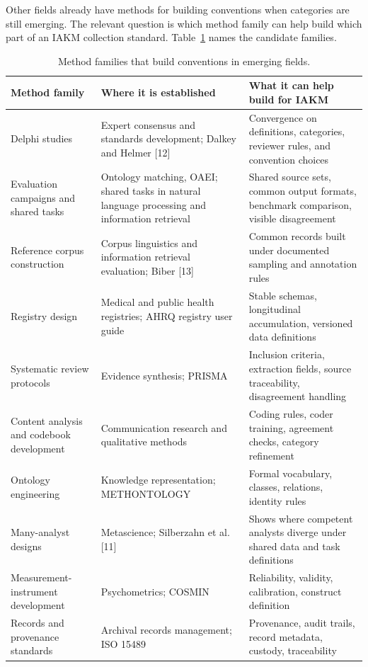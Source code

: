 \documentclass[preprints,article,submit,moreauthors]{Definitions/mdpi}
\begin{document}
Other fields already have methods for building conventions when categories are still emerging. The relevant question is which method family can help build which part of an IAKM collection standard. Table~\ref{tab:families} names the candidate families.

\begin{table}[H]
\caption{Method families that build conventions in emerging fields.}
\label{tab:families}
\centering
\scriptsize
\begin{tabularx}{\textwidth}{XXX}
\hline
\textbf{Method family} & \textbf{Where it is established} & \textbf{What it can help build for IAKM} \\
\hline
Delphi studies & Expert consensus and standards development; Dalkey and Helmer [12] & Convergence on definitions, categories, reviewer rules, and convention choices \\
Evaluation campaigns and shared tasks & Ontology matching, OAEI; shared tasks in natural language processing and information retrieval & Shared source sets, common output formats, benchmark comparison, visible disagreement \\
Reference corpus construction & Corpus linguistics and information retrieval evaluation; Biber [13] & Common records built under documented sampling and annotation rules \\
Registry design & Medical and public health registries; AHRQ registry user guide & Stable schemas, longitudinal accumulation, versioned data definitions \\
Systematic review protocols & Evidence synthesis; PRISMA & Inclusion criteria, extraction fields, source traceability, disagreement handling \\
Content analysis and codebook development & Communication research and qualitative methods & Coding rules, coder training, agreement checks, category refinement \\
Ontology engineering & Knowledge representation; METHONTOLOGY & Formal vocabulary, classes, relations, identity rules \\
Many-analyst designs & Metascience; Silberzahn et al. [11] & Shows where competent analysts diverge under shared data and task definitions \\
Measurement-instrument development & Psychometrics; COSMIN & Reliability, validity, calibration, construct definition \\
Records and provenance standards & Archival records management; ISO 15489 & Provenance, audit trails, record metadata, custody, traceability \\
\hline
\end{tabularx}
\end{table}
\end{document}
